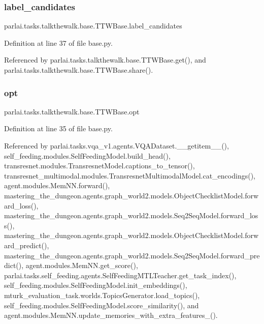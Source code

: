 \subsubsection{\texorpdfstring{label\+\_\+candidates}{label\_candidates}}
{\footnotesize\ttfamily parlai.\+tasks.\+talkthewalk.\+base.\+T\+T\+W\+Base.\+label\+\_\+candidates}



Definition at line 37 of file base.\+py.



Referenced by parlai.\+tasks.\+talkthewalk.\+base.\+T\+T\+W\+Base.\+get(), and parlai.\+tasks.\+talkthewalk.\+base.\+T\+T\+W\+Base.\+share().

\mbox{\label{classparlai_1_1tasks_1_1talkthewalk_1_1base_1_1TTWBase_aa716b1fde5dd6d0409ff111df962067e}} 
\subsubsection{\texorpdfstring{opt}{opt}}
{\footnotesize\ttfamily parlai.\+tasks.\+talkthewalk.\+base.\+T\+T\+W\+Base.\+opt}



Definition at line 35 of file base.\+py.



Referenced by parlai.\+tasks.\+vqa\+\_\+v1.\+agents.\+V\+Q\+A\+Dataset.\+\_\+\+\_\+getitem\+\_\+\+\_\+(), self\+\_\+feeding.\+modules.\+Self\+Feeding\+Model.\+build\+\_\+head(), transresnet.\+modules.\+Transresnet\+Model.\+captions\+\_\+to\+\_\+tensor(), transresnet\+\_\+multimodal.\+modules.\+Transresnet\+Multimodal\+Model.\+cat\+\_\+encodings(), agent.\+modules.\+Mem\+N\+N.\+forward(), mastering\+\_\+the\+\_\+dungeon.\+agents.\+graph\+\_\+world2.\+models.\+Object\+Checklist\+Model.\+forward\+\_\+loss(), mastering\+\_\+the\+\_\+dungeon.\+agents.\+graph\+\_\+world2.\+models.\+Seq2\+Seq\+Model.\+forward\+\_\+loss(), mastering\+\_\+the\+\_\+dungeon.\+agents.\+graph\+\_\+world2.\+models.\+Object\+Checklist\+Model.\+forward\+\_\+predict(), mastering\+\_\+the\+\_\+dungeon.\+agents.\+graph\+\_\+world2.\+models.\+Seq2\+Seq\+Model.\+forward\+\_\+predict(), agent.\+modules.\+Mem\+N\+N.\+get\+\_\+score(), parlai.\+tasks.\+self\+\_\+feeding.\+agents.\+Self\+Feeding\+M\+T\+L\+Teacher.\+get\+\_\+task\+\_\+index(), self\+\_\+feeding.\+modules.\+Self\+Feeding\+Model.\+init\+\_\+embeddings(), mturk\+\_\+evaluation\+\_\+task.\+worlds.\+Topics\+Generator.\+load\+\_\+topics(), self\+\_\+feeding.\+modules.\+Self\+Feeding\+Model.\+score\+\_\+similarity(), and agent.\+modules.\+Mem\+N\+N.\+update\+\_\+memories\+\_\+with\+\_\+extra\+\_\+features\+\_\+().

